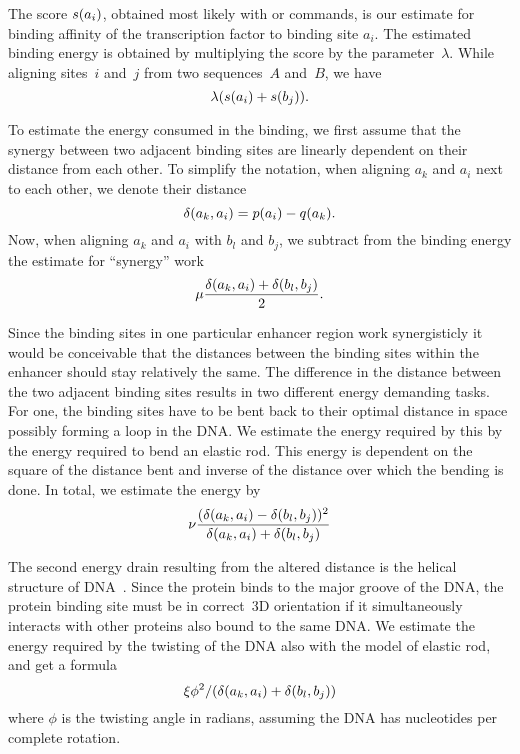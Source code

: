 The score $s({a_i})$, obtained most likely with 
or  commands, is our estimate for binding
affinity of the transcription factor to binding site $a_i$. The
estimated binding energy
is obtained by multiplying the score by the parameter~$\lambda$. While
aligning sites~$i$ and~$j$ from two sequences~$A$ and~$B$, we have
\begin{equation}
  \label{eq:scoreReward}
  \lambda(s({a_i})+s({b_j})).
\end{equation}

To estimate the energy consumed in the binding, we first assume that
the synergy between two adjacent binding sites are linearly dependent
on their distance from each other. To simplify the notation, when
aligning $a_k$ and $a_i$ next to each other, we denote their distance
\begin{equation}
  \label{eq:deltaNotation}
  \delta(a_k,a_i)=p({a_i})-q({a_k}).
\end{equation}
Now, when aligning $a_k$ and $a_i$ with $b_l$ and $b_j$, we subtract
from the binding energy the estimate for ``synergy'' work
\begin{equation}
  \label{eq:linearPenalty}
  \mu\frac{\delta(a_k,a_i)+\delta(b_l,b_j)}{2}.
\end{equation}

Since the binding sites in one particular enhancer region work
synergisticly it would be conceivable that the distances between the
binding sites within the enhancer should stay relatively the same. The
difference in the distance between the two adjacent binding sites
results in two different energy demanding tasks. For one, the binding
sites have to be bent back to their optimal distance in space possibly
forming a loop in the DNA. We estimate the energy required by this by
the energy required to bend an elastic rod. This energy is dependent
on the square of the distance bent and inverse of the distance over
which the bending is done. In total, we estimate the energy by
\begin{equation}
  \label{eq:bendingPenalty}
  \nu \frac{(\delta(a_k,a_i)-\delta(b_l,b_j))^2}{\delta(a_k,a_i)+\delta(b_l,b_j)}
\end{equation}

The second energy drain resulting from the altered distance is the
helical structure of DNA~\cite{WatsonCrick53}. Since the protein binds
to the major groove of the DNA, the protein binding site must be in
correct~3D orientation if it simultaneously interacts with other
proteins also bound to the same DNA. We estimate the energy required
by the twisting of the DNA also with the model of elastic rod, and get
a formula
\begin{equation}
  \label{eq:twistingPenalty}
  \xi \phi^2/(\delta(a_k,a_i)+\delta(b_l,b_j))  
\end{equation}
where $\phi$ is the twisting angle in radians, assuming the DNA has
 nucleotides per complete rotation.

